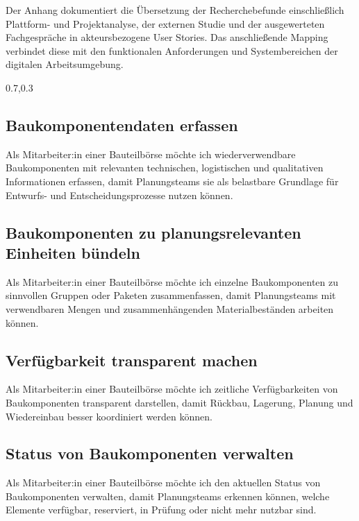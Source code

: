 \label{anlage:user-stories}

Der Anhang dokumentiert die Übersetzung der Recherchebefunde einschließlich Plattform- und Projektanalyse, der externen Studie und der ausgewerteten Fachgespräche in akteursbezogene User Stories. Das anschließende Mapping verbindet diese mit den funktionalen Anforderungen und Systembereichen der digitalen Arbeitsumgebung.

\begin{Table}[title=Übersicht]
\begin{SemioTable}{0.7,0.3}
\end{SemioTable}
\end{Table}


\subsection{Baukomponentendaten erfassen}
\label{us:bb-01} Als Mitarbeiter:in einer Bauteilbörse möchte ich wiederverwendbare Baukomponenten mit relevanten technischen, logistischen und qualitativen Informationen erfassen, damit Planungsteams sie als belastbare Grundlage für Entwurfs- und Entscheidungsprozesse nutzen können.

\subsection{Baukomponenten zu planungsrelevanten Einheiten bündeln}
\label{us:bb-02} Als Mitarbeiter:in einer Bauteilbörse möchte ich einzelne Baukomponenten zu sinnvollen Gruppen oder Paketen zusammenfassen, damit Planungsteams mit verwendbaren Mengen und zusammenhängenden Materialbeständen arbeiten können.

\subsection{Verfügbarkeit transparent machen}
\label{us:bb-03} Als Mitarbeiter:in einer Bauteilbörse möchte ich zeitliche Verfügbarkeiten von Baukomponenten transparent darstellen, damit Rückbau, Lagerung, Planung und Wiedereinbau besser koordiniert werden können.

\subsection{Status von Baukomponenten verwalten}
\label{us:bb-04} Als Mitarbeiter:in einer Bauteilbörse möchte ich den aktuellen Status von Baukomponenten verwalten, damit Planungsteams erkennen können, welche Elemente verfügbar, reserviert, in Prüfung oder nicht mehr nutzbar sind.

